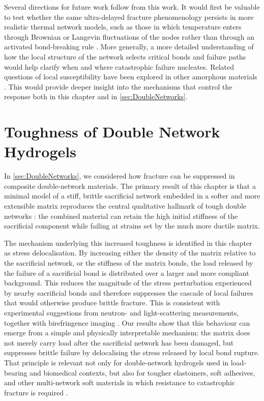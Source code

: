 Several directions for future work follow from this work. It would first be valuable to test whether the same ultra-delayed fracture phenomenology persists in more realistic thermal network models, such as those in which temperature enters through Brownian or Langevin fluctuations of the nodes rather than through an activated bond-breaking rule \cite{tauber_role_2020}. More generally, a more detailed understanding of how the local structure of the network selects critical bonds and failure paths would help clarify when and where catastrophic failure nucleates. Related questions of local susceptibility have been explored in other amorphous materials \cite{mattsson_time-dependent_2017,cipelletti_microscopic_2020,aime_microscopic_2018}. This would provide deeper insight into the mechanisms that control the response both in this chapter and in \cref{sec:DoubleNetworks}.

\section*{Toughness of Double Network Hydrogels}
In \cref{sec:DoubleNetworks}, we considered how fracture can be suppressed in composite double-network materials. The primary result of this chapter is that a minimal model of a stiff, brittle sacrificial network embedded in a softer and more extensible matrix reproduces the central qualitative hallmark of tough double networks \cite{gong_double-network_2003,gong_why_2010,ducrot_toughening_2014,millereauMechanicsElastomericMolecular2018,kingMacroscaleDoubleNetworks2019,takahashiCreatingStiffTough2018}: the combined material can retain the high initial stiffness of the sacrificial component while failing at strains set by the much more ductile matrix.

The mechanism underlying this increased toughness is identified in this chapter as stress delocalisation. By increasing either the density of the matrix relative to the sacrificial network, or the stiffness of the matrix bonds, the load released by the failure of a sacrificial bond is distributed over a larger and more compliant background. This reduces the magnitude of the stress perturbation experienced by nearby sacrificial bonds and therefore suppresses the cascade of local failures that would otherwise produce brittle fracture. This is consistent with experimental suggestions from neutron- and light-scattering measurements, together with birefringence imaging \cite{ducrot_structure_2015,tominaga_molecular_2007,huang_importance_2007,zheng_how_2021,Orr2026}. Our results show that this behaviour can emerge from a simple and physically interpretable mechanism: the matrix does not merely carry load after the sacrificial network has been damaged, but suppresses brittle failure by delocalising the stress released by local bond rupture. That principle is relevant not only for double-network hydrogels used in load-bearing and biomedical contexts, but also for tougher elastomers, soft adhesives, and other multi-network soft materials in which resistance to catastrophic fracture is required \cite{gong_why_2010,millereauMechanicsElastomericMolecular2018,kingMacroscaleDoubleNetworks2019,takahashiCreatingStiffTough2018}.

